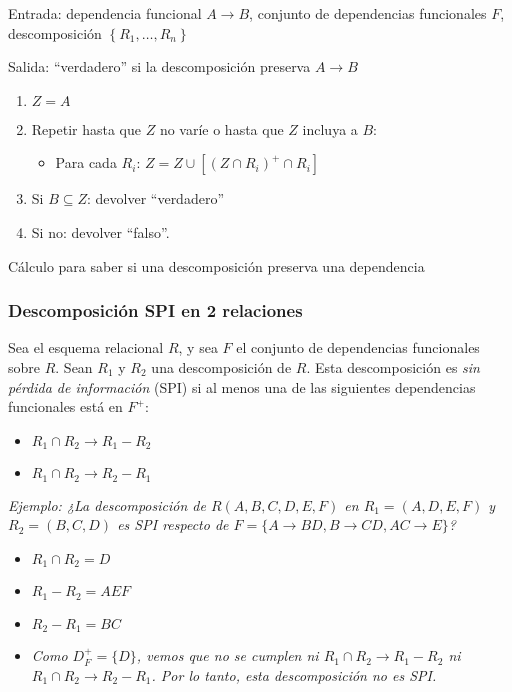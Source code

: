 \documentclass[a4paper, twoside]{article}
\begin{document}
\begin{algorithm}[H]
Entrada: dependencia funcional $A\to B$, conjunto de dependencias
funcionales $F$, descomposición $\left\{ R_{1},\ldots,R_{n}\right\} $

Salida: ``verdadero'' si la descomposición preserva $A\to B$
\begin{enumerate}
\item $Z=A$
\item Repetir hasta que $Z$ no varíe o hasta que $Z$ incluya a $B$:

\begin{itemize}
\item Para cada $R_{i}$: $Z=Z\cup\left[\left(Z\cap R_{i}\right)^{+}\cap R_{i}\right]$
\end{itemize}
\item Si $B\subseteq Z$: devolver ``verdadero''
\item Si no: devolver ``falso''.
\end{enumerate}
\protect\caption{Cálculo para saber si una descomposición preserva una dependencia}
\end{algorithm}



\subsubsection{Descomposición SPI en 2 relaciones}

Sea el esquema relacional $R$, y sea $F$ el conjunto de dependencias
funcionales sobre $R$. Sean $R_{1}$ y $R_{2}$ una descomposición
de $R$. Esta descomposición es \emph{sin pérdida de información}
(SPI) si al menos una de las siguientes dependencias funcionales está
en $F^{+}$:
\begin{itemize}
\item $R_{1}\cap R_{2}\to R_{1}-R_{2}$
\item $R_{1}\cap R_{2}\to R_{2}-R_{1}$
\end{itemize}
\emph{Ejemplo: ¿La descomposición de $R(A,B,C,D,E,F)$ en $R_{1}=(A,D,E,F)$
y $R_{2}=(B,C,D)$ es SPI respecto de $F=\{A\to BD,B\to CD,AC\to E\}$?}
\begin{itemize}
\item $R_{1}\cap R_{2}=D$
\item $R_{1}-R_{2}=AEF$
\item $R_{2}-R_{1}=BC$
\item \emph{Como $D_{F}^{+}=\{D\}$, vemos que no se cumplen ni $R_{1}\cap R_{2}\to R_{1}-R_{2}$
ni $R_{1}\cap R_{2}\to R_{2}-R_{1}$. Por lo tanto, esta descomposición
no es SPI. }
\end{itemize}
\end{document}
